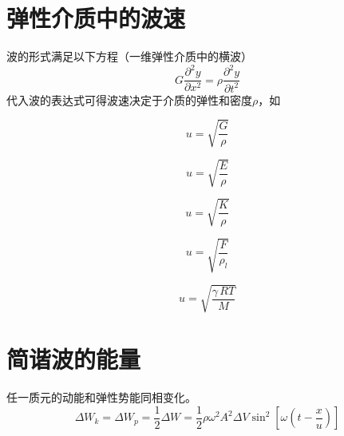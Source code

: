 \section{弹性介质中的波速}
波的形式满足以下方程（一维弹性介质中的横波） 
\begin{equation}
G\frac{\partial^2 y}{\partial x^2}=\rho \frac{\partial^2 y}{\partial t^2}
\end{equation}
代入波的表达式可得波速决定于介质的弹性和密度$\rho $，如\jg

\par \dya[各向同性介质中横波波速]
\begin{equation}
u=\sqrt{\frac{G}{\rho}}
\end{equation}

\par \dya[各向同性介质中纵波波速]
\begin{equation}
u=\sqrt{\frac{E}{\rho}}
\end{equation}

\par \dya[液体、气体中纵波波速]
\begin{equation}
u=\sqrt{\frac{K}{\rho}}
\end{equation}

\par \dya[拉紧的绳中的横波波速]
\begin{equation}
u=\sqrt{\frac{F}{\rho_l}}
\end{equation}

\par \dya[气体中声波波速]
\begin{equation}
u=\sqrt{\frac{\gamma\,RT}{M}}
\end{equation}

\section{简谐波的能量}
 任一质元的动能和弹性势能同相变化。
\begin{equation}
\Delta W_k =\Delta W_p = \frac{1}{2}\Delta W= \frac{1}{2} \rho \omega^2A^2\Delta V\sin^2\left[ \omega (t-\frac{x}{u})\right] 
\end{equation}

